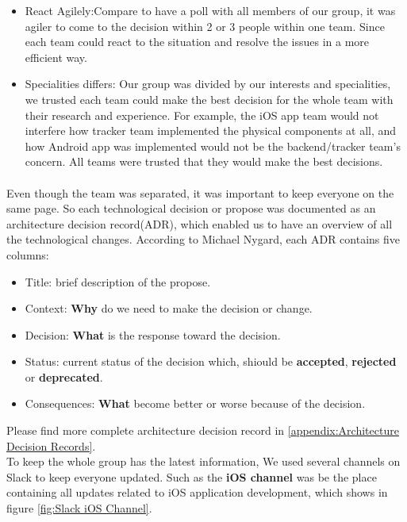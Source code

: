 \documentclass[12pt,a4paper]{article}
\begin{document}
        \begin{itemize}
          \item {React Agilely}:Compare to have a poll with all members of our group, it was agiler to come to the decision within 2 or 3 people within one team. Since each team could react to the situation and resolve the issues in a more efficient way.
          \item {Specialities differs}: Our group was divided by our interests and specialities, we trusted each team could make the best decision for the whole team with their research and experience. For example, the iOS app team would not interfere how tracker team implemented the physical components at all, and how Android app was implemented would not be the backend/tracker team's concern. All teams were trusted that they would make the best decisions.
        \end{itemize}
        
        \paragraph{}Even though the team was separated, it was important to keep everyone on the same page. So each technological decision or propose was documented as an architecture decision record(ADR), which enabled us to have an overview of all the technological changes. According to Michael Nygard, each ADR contains five columns\cite{ArchitectureDecisionRecord}: 

        \begin{itemize}
          \item Title: brief description of the propose.
          \item Context: {\bf Why} do we need to make the decision or change.                   
          \item Decision: {\bf What} is the response toward the decision.
          \item Status: current status of the decision which, shiould be {\bf accepted}, {\bf rejected} or {\bf deprecated}.
          \item Consequences: {\bf What} become better or worse because of the decision.
        \end{itemize}

        Please find more complete architecture decision record in \ref{appendix:Architecture Decision Records}.\\
        
        To keep the whole group has the latest information, We used several channels on Slack to keep everyone updated. Such as the {\bf iOS channel} was be the place containing all updates related to iOS application development, which shows in figure \ref{fig:Slack iOS Channel}. 
        
\end{document}
